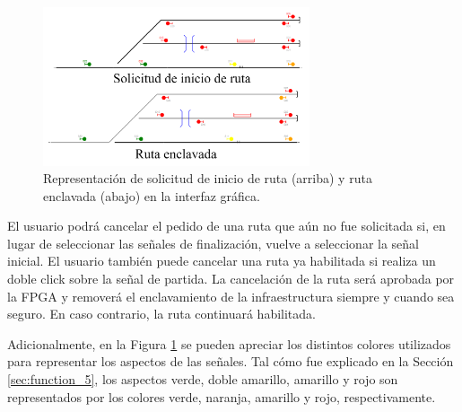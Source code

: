 	\begin{figure}[H]
		\centering
		\includegraphics[width=0.7\textwidth]{AGG/images/AGG_routes}
		\centering\caption{Representación de solicitud de inicio de ruta (arriba) y ruta enclavada (abajo) en la interfaz gráfica.}
		\label{fig:AGG_routes}
	\end{figure}
	
	El usuario podrá cancelar el pedido de una ruta que aún no fue solicitada si, en lugar de seleccionar las señales de finalización, vuelve a seleccionar la señal inicial. El usuario también puede cancelar una ruta ya habilitada si realiza un doble click sobre la señal de partida. La cancelación de la ruta será aprobada por la FPGA y removerá el enclavamiento de la infraestructura siempre y cuando sea seguro. En caso contrario, la ruta continuará habilitada.
	
	Adicionalmente, en la Figura \ref{fig:AGG_routes} se pueden apreciar los distintos colores utilizados para representar los aspectos de las señales. Tal cómo fue explicado en la Sección \ref{sec:function_5}, los aspectos verde, doble amarillo, amarillo y rojo son representados por los colores verde, naranja, amarillo y rojo, respectivamente.
		
	
	



	